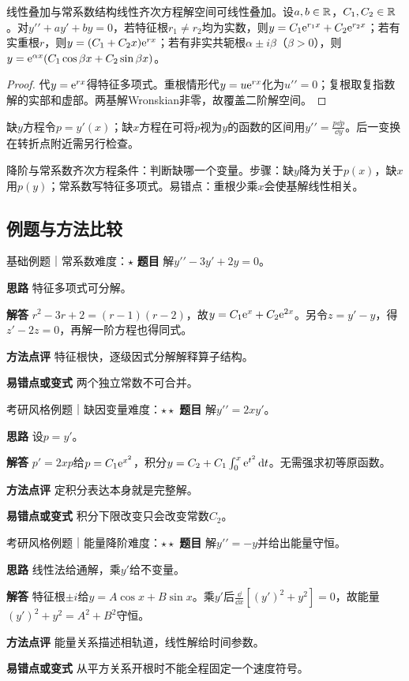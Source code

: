 \begin{theorem}{线性叠加与常系数结构}线性齐次方程解空间可线性叠加。设$a,b\in\mathbb{R}$，$C_1,C_2\in\mathbb{R}$。对$y\prime\prime+ay\prime+by=0$，若特征根$r_1\ne r_2$均为实数，则$y=C_1\mathrm{e}^{r_1x}+C_2\mathrm{e}^{r_2x}$；若有实重根$r$，则$y=(C_1+C_2x)\mathrm{e}^{rx}$；若有非实共轭根$\alpha\pm i\beta$（$\beta>0$），则$y=\mathrm{e}^{\alpha x}(C_1\cos\beta x+C_2\sin\beta x)$。\end{theorem}
\begin{proof}代$y=\mathrm{e}^{rx}$得特征多项式。重根情形代$y=u\mathrm{e}^{rx}$化为$u\prime\prime=0$；复根取复指数解的实部和虚部。两基解Wronskian非零，故覆盖二阶解空间。\end{proof}
缺$y$方程令$p=y\prime(x)$；缺$x$方程在可将$p$视为$y$的函数的区间用$y\prime\prime=\frac{p\dd p}{\dd y}$。后一变换在转折点附近需另行检查。

\begin{method}{降阶与常系数齐次方程}条件：判断缺哪一个变量。步骤：缺$y$降为关于$p(x)$，缺$x$用$p(y)$；常系数写特征多项式。易错点：重根少乘$x$会使基解线性相关。\end{method}
\subsection{例题与方法比较}
\begin{example}{基础例题｜常系数}{难度：$\star$}
\label{ex:4:7}\textbf{题目} 解$y\prime\prime-3y\prime+2y=0$。\par
\textbf{思路} 特征多项式可分解。\par
\textbf{解答} $r^2-3r+2=(r-1)(r-2)$，故$y=C_1\mathrm{e}^x+C_2\mathrm{e}^{2x}$。另令$z=y\prime-y$，得$z\prime-2z=0$，再解一阶方程也得同式。\par
\textbf{方法点评} 特征根快，逐级因式分解解释算子结构。\par
\textbf{易错点或变式} 两个独立常数不可合并。
\end{example}
\begin{example}{考研风格例题｜缺因变量}{难度：$\star\star$}
\label{ex:4:8}\textbf{题目} 解$y\prime\prime=2xy\prime$。\par
\textbf{思路} 设$p=y\prime$。\par
\textbf{解答} $p\prime=2xp$给$p=C_1\mathrm{e}^{x^2}$，积分$y=C_2+C_1\int_0^x\mathrm{e}^{t^2}\mathop{}\!\mathrm{d} t$。无需强求初等原函数。\par
\textbf{方法点评} 定积分表达本身就是完整解。\par
\textbf{易错点或变式} 积分下限改变只会改变常数$C_2$。
\end{example}
\begin{example}{考研风格例题｜能量降阶}{难度：$\star\star$}
\label{ex:4:9}\textbf{题目} 解$y\prime\prime=-y$并给出能量守恒。\par
\textbf{思路} 线性法给通解，乘$y\prime$给不变量。\par
\textbf{解答} 特征根$\pm i$给$y=A\cos x+B\sin x$。乘$y\prime$后$\frac\dd{\dd x}[(y\prime)^2+y^2]=0$，故能量$(y\prime)^2+y^2=A^2+B^2$守恒。\par
\textbf{方法点评} 能量关系描述相轨道，线性解给时间参数。\par
\textbf{易错点或变式} 从平方关系开根时不能全程固定一个速度符号。
\end{example}
